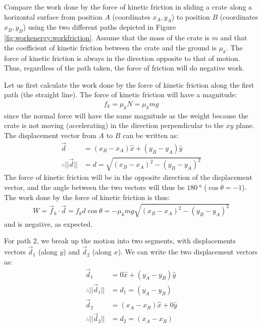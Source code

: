 \begin{example}{\label{ex:workenergy:workfriction}
Compare the work done by the force of kinetic friction in sliding a crate along a horizontal surface from position $A$ (coordinates $x_A, y_A$) to position $B$ (coordinates $x_B, y_B$) using the two different paths depicted in Figure \ref{fig:workenergy:workfriction}. Assume that the mass of the crate is $m$ and that the coefficient of kinetic friction between the crate and the ground is $\mu_k$.}
The force of kinetic friction is always in the direction opposite to that of motion. Thus, regardless of the path taken, the force of friction will do negative work. 

Let us first calculate the work done by the force of kinetic friction along the first path (the straight line). The force of kinetic friction will have a magnitude:
\begin{align*}
f_k = \mu_k N = \mu_k mg
\end{align*}
since the normal force will have the same magnitude as the weight because the crate is not moving (accelerating) in the direction perpendicular to the $xy$ plane.  The displacement vector from $A$ to $B$ can be written as:
\begin{align*}
\vec d &= (x_B-x_A)\hat x + (y_B-y_A) \hat y\\
\therefore ||\vec d|| &=d= \sqrt{(x_B-x_A)^2 - (y_B-y_A)^2}
\end{align*}  
The force of kinetic friction will be in the opposite direction of the displacement vector, and the angle between the two vectors will thus be $\SI{180}{\degree}$ ($\cos\theta=-1$). The work done by the force of kinetic friction is thus:
\begin{align*}
W = \vec f_k \cdot\vec d = f_k d \cos\theta = -\mu_k mg\sqrt{(x_B-x_A)^2 - (y_B-y_A)^2}
\end{align*}
and is negative, as expected.

For path 2, we break up the motion into two segments, with displacements vectors $\vec d_1$ (along $y$) and $\vec d_2$ (along $x$). We can write the two displacement vectors as:
\begin{align*}
\vec d_1 &= 0\hat x + (y_A-y_B) \hat y\\
\therefore ||\vec d_1||&=d_1=(y_A-y_B)\\
\vec d_2 &= (x_A-x_B)\hat x + 0 \hat y\\
\therefore ||\vec d_2||&=d_2=(x_A-x_B)\\
\end{align*}


\end{example}
